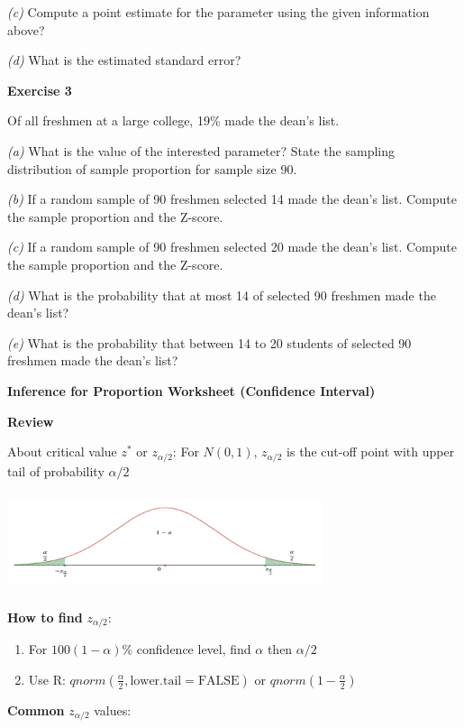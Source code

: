 \documentclass[
]{book}
\begin{document}
\emph{(c)} Compute a point estimate for the parameter using the given information above?

\emph{(d)} What is the estimated standard error?

\textbf{Exercise 3}

Of all freshmen at a large college, 19\% made the dean's list.

\emph{(a)} What is the value of the interested parameter? State the sampling distribution of sample proportion for sample size 90.

\emph{(b)} If a random sample of 90 freshmen selected 14 made the dean's list. Compute the sample proportion and the Z-score.

\emph{(c)} If a random sample of 90 freshmen selected 20 made the dean's list. Compute the sample proportion and the Z-score.

\emph{(d)} What is the probability that at most 14 of selected 90 freshmen made the dean's list?

\emph{(e)} What is the probability that between 14 to 20 students of selected 90 freshmen made the dean's list?

\textbf{Inference for Proportion Worksheet (Confidence Interval)}

\textbf{Review}

About critical value \(z^*\) or \(z_{\alpha/2}\): For \(N(0,1)\), \(z_{\alpha/2}\) is the cut-off point with upper tail of probability \(\alpha/2\)

\includegraphics[width=3.64583in,height=1.14583in]{images/img48.png}

\textbf{How to find} \(z_{\alpha/2}\):

\begin{enumerate}
\def\labelenumi{(\arabic{enumi})}
\item
  For \(100(1-\alpha)\%\) confidence level, find \(\alpha\) then \(\alpha/2\)
\item
  Use R: \(qnorm\left(\frac{\alpha}{2}, \text{lower.tail} = \text{FALSE}\right)\) or \(qnorm\left(1 - \frac{\alpha}{2}\right)\)
\end{enumerate}

\textbf{Common} \(z_{\alpha/2}\) values:
\end{document}
